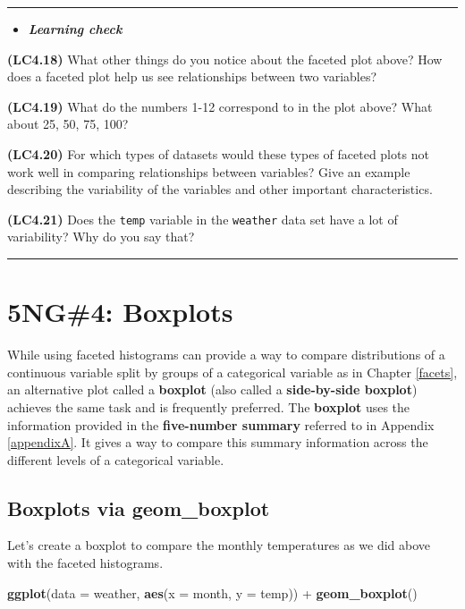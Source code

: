 \documentclass[]{tufte-book}
\newenvironment{Shaded}{\begin{snugshade}}{\end{snugshade}}
\newcommand{\KeywordTok}[1]{\textcolor[rgb]{0.13,0.29,0.53}{\textbf{{#1}}}}
\newcommand{\DataTypeTok}[1]{\textcolor[rgb]{0.13,0.29,0.53}{{#1}}}
\newcommand{\StringTok}[1]{\textcolor[rgb]{0.31,0.60,0.02}{{#1}}}
\newcommand{\NormalTok}[1]{{#1}}
\let\oldrule=\rule
\renewcommand{\rule}[1]{\oldrule{\linewidth}}
\newenvironment{rmdblock}[1]
  {\begin{shaded*}
  \begin{itemize}
  \renewcommand{\labelitemi}{
    \raisebox{-.7\height}[0pt][0pt]{
    }
  }
  \item
  }
  {
  \end{itemize}
  \end{shaded*}
  }
\newenvironment{learncheck}
  {\begin{rmdblock}{warning}}
  {\end{rmdblock}}
\theoremstyle{definition}
\theoremstyle{definition}
\theoremstyle{remark}
\begin{document}
\begin{center}\rule{0.5\linewidth}{\linethickness}\end{center}

\begin{learncheck}
\textbf{\emph{Learning check}}
\end{learncheck}

\textbf{(LC4.18)} What other things do you notice about the faceted plot
above? How does a faceted plot help us see relationships between two
variables?

\textbf{(LC4.19)} What do the numbers 1-12 correspond to in the plot
above? What about 25, 50, 75, 100?

\textbf{(LC4.20)} For which types of datasets would these types of
faceted plots not work well in comparing relationships between
variables? Give an example describing the variability of the variables
and other important characteristics.

\textbf{(LC4.21)} Does the \texttt{temp} variable in the
\texttt{weather} data set have a lot of variability? Why do you say
that?

\begin{center}\rule{0.5\linewidth}{\linethickness}\end{center}

\section{5NG\#4: Boxplots}\label{ng4-boxplots}

While using faceted histograms can provide a way to compare
distributions of a continuous variable split by groups of a categorical
variable as in Chapter \ref{facets}, an alternative plot called a
\textbf{boxplot} (also called a \textbf{side-by-side boxplot}) achieves
the same task and is frequently preferred. The \textbf{boxplot} uses the
information provided in the \textbf{five-number summary} referred to in
Appendix \ref{appendixA}. It gives a way to compare this summary
information across the different levels of a categorical variable.

\subsection{Boxplots via geom\_boxplot}\label{geomboxplot}

Let's create a boxplot to compare the monthly temperatures as we did
above with the faceted histograms.

\begin{Shaded}
\begin{Highlighting}[]
\KeywordTok{ggplot}\NormalTok{(}\DataTypeTok{data =} \NormalTok{weather, }\KeywordTok{aes}\NormalTok{(}\DataTypeTok{x =} \NormalTok{month, }\DataTypeTok{y =} \NormalTok{temp)) +}
\StringTok{  }\KeywordTok{geom_boxplot}\NormalTok{()}
\end{Highlighting}
\end{Shaded}
\end{document}

